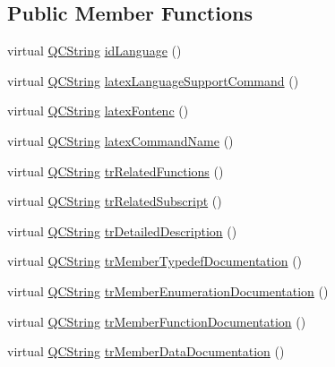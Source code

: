 \subsection*{Public Member Functions}
\begin{DoxyCompactItemize}
\item 
virtual \mbox{\hyperlink{class_q_c_string}{Q\+C\+String}} \mbox{\hyperlink{class_translator_vietnamese_a553f57360200d8d7120013cc10d25c48}{id\+Language}} ()
\item 
virtual \mbox{\hyperlink{class_q_c_string}{Q\+C\+String}} \mbox{\hyperlink{class_translator_vietnamese_a40aa5ca6be73b698e3af89f889c1e636}{latex\+Language\+Support\+Command}} ()
\item 
virtual \mbox{\hyperlink{class_q_c_string}{Q\+C\+String}} \mbox{\hyperlink{class_translator_vietnamese_aa6626da0407f685b42d9c40bdf83b62e}{latex\+Fontenc}} ()
\item 
virtual \mbox{\hyperlink{class_q_c_string}{Q\+C\+String}} \mbox{\hyperlink{class_translator_vietnamese_aa25246769e54e9e07fa253a31666b824}{latex\+Command\+Name}} ()
\item 
virtual \mbox{\hyperlink{class_q_c_string}{Q\+C\+String}} \mbox{\hyperlink{class_translator_vietnamese_a208958837ef8ed02352ce9dc16cce071}{tr\+Related\+Functions}} ()
\item 
virtual \mbox{\hyperlink{class_q_c_string}{Q\+C\+String}} \mbox{\hyperlink{class_translator_vietnamese_abe6594d7858039d1a55eee127eab219f}{tr\+Related\+Subscript}} ()
\item 
virtual \mbox{\hyperlink{class_q_c_string}{Q\+C\+String}} \mbox{\hyperlink{class_translator_vietnamese_a93069f1bc56d8eedc4e527b552603ab4}{tr\+Detailed\+Description}} ()
\item 
virtual \mbox{\hyperlink{class_q_c_string}{Q\+C\+String}} \mbox{\hyperlink{class_translator_vietnamese_ac2b22a5b4506767f25df82a0903bebb0}{tr\+Member\+Typedef\+Documentation}} ()
\item 
virtual \mbox{\hyperlink{class_q_c_string}{Q\+C\+String}} \mbox{\hyperlink{class_translator_vietnamese_a07b978a239e1f91a9024ed3bfbfb9a55}{tr\+Member\+Enumeration\+Documentation}} ()
\item 
virtual \mbox{\hyperlink{class_q_c_string}{Q\+C\+String}} \mbox{\hyperlink{class_translator_vietnamese_aa61aa84f719d581ea36834c2714a116a}{tr\+Member\+Function\+Documentation}} ()
\item 
virtual \mbox{\hyperlink{class_q_c_string}{Q\+C\+String}} \mbox{\hyperlink{class_translator_vietnamese_a5bbac145b50f00180d4dd1463af81f48}{tr\+Member\+Data\+Documentation}} ()

\end{DoxyCompactItemize}
